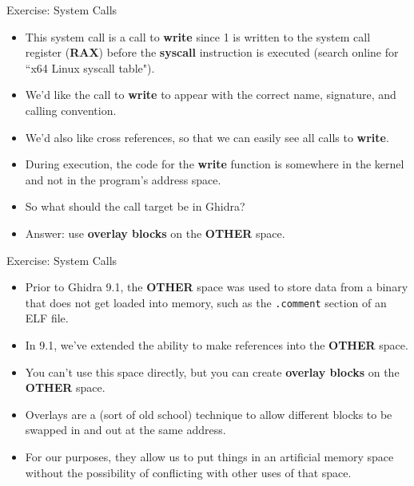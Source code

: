\documentclass{beamer}
\begin{document}
\begin{frame}
\begin{block}{Exercise: System Calls}
\begin{itemize}
\item This system call is a call to \textbf{write} since 1 is written to the system call register (\textbf{RAX}) before the \textbf{syscall} 
instruction is executed (search online for ``x64 Linux syscall table").
\item We'd like the call to \textbf{write} to appear with the correct name, signature, and calling convention.
\item We'd also like cross references, so that we can easily see all calls to \textbf{write}.
\item During execution, the code for the \textbf{write} function is somewhere in the kernel and not in the program's address space.
\item So what should the call target be in Ghidra?
\item Answer: use \textbf{overlay blocks} on the \textbf{OTHER} space.
\end{itemize}
\end{block}
\end{frame}

\begin{frame}
\begin{block}{Exercise: System Calls}
\begin{itemize}
\item Prior to Ghidra 9.1, the \textbf{OTHER} space was used to store data from a binary that does not get loaded into memory, such as the \texttt{.comment} section of an ELF file.
\item In 9.1, we've extended the ability to make references into the \textbf{OTHER} space.
\item You can't use this space directly, but you can create \textbf{overlay blocks} on the \textbf{OTHER} space.
\item Overlays are a (sort of old school) technique to allow different blocks to be swapped in and out at the same address.  
\item For our purposes, they allow us to put things in an artificial memory space without the possibility of conflicting with other uses of that space.
\end{itemize}
\end{block}
\end{frame}
\end{document}
